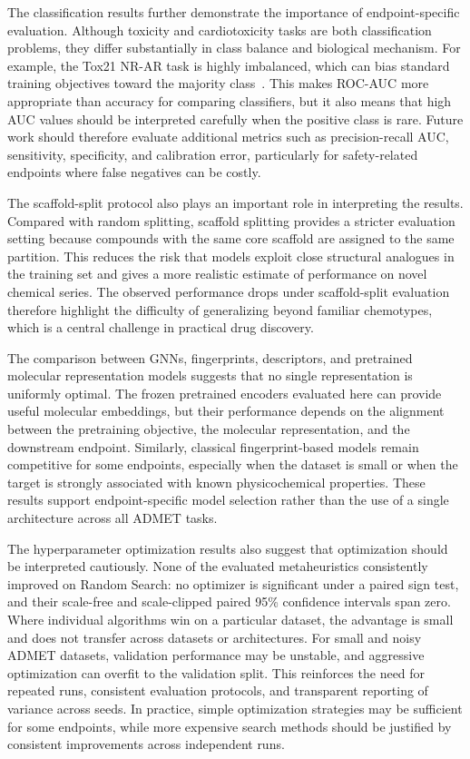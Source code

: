 \documentclass[journal]{IEEEtran}
\begin{document}
The classification results further demonstrate the importance of endpoint-specific evaluation.
Although toxicity and cardiotoxicity tasks are both classification problems, they differ substantially in class balance and biological mechanism.
For example, the Tox21 NR-AR task is highly imbalanced, which can bias standard training objectives toward the majority class~\cite{he2009imbalanced}.
This makes ROC-AUC more appropriate than accuracy for comparing classifiers, but it also means that high AUC values should be interpreted carefully when the positive class is rare.
Future work should therefore evaluate additional metrics such as precision-recall AUC, sensitivity, specificity, and calibration error, particularly for safety-related endpoints where false negatives can be costly.

The scaffold-split protocol also plays an important role in interpreting the results.
Compared with random splitting, scaffold splitting provides a stricter evaluation setting because compounds with the same core scaffold are assigned to the same partition.
This reduces the risk that models exploit close structural analogues in the training set and gives a more realistic estimate of performance on novel chemical series.
The observed performance drops under scaffold-split evaluation therefore highlight the difficulty of generalizing beyond familiar chemotypes, which is a central challenge in practical drug discovery.

The comparison between GNNs, fingerprints, descriptors, and pretrained molecular representation models suggests that no single representation is uniformly optimal.
The frozen pretrained encoders evaluated here can provide useful molecular embeddings, but their performance depends on the alignment between the pretraining objective, the molecular representation, and the downstream endpoint.
Similarly, classical fingerprint-based models remain competitive for some endpoints, especially when the dataset is small or when the target is strongly associated with known physicochemical properties.
These results support endpoint-specific model selection rather than the use of a single architecture across all ADMET tasks.

The hyperparameter optimization results also suggest that optimization should be interpreted cautiously.
None of the evaluated metaheuristics consistently improved on Random Search: no optimizer is significant under a paired sign test, and their scale-free and scale-clipped paired 95\% confidence intervals span zero.
Where individual algorithms win on a particular dataset, the advantage is small and does not transfer across datasets or architectures.
For small and noisy ADMET datasets, validation performance may be unstable, and aggressive optimization can overfit to the validation split.
This reinforces the need for repeated runs, consistent evaluation protocols, and transparent reporting of variance across seeds.
In practice, simple optimization strategies may be sufficient for some endpoints, while more expensive search methods should be justified by consistent improvements across independent runs.
\end{document}
